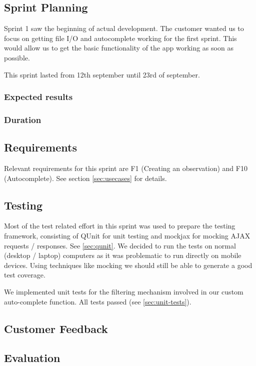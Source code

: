 \subsection{Sprint Planning}

	Sprint 1 saw the beginning of actual development. The customer wanted us to focus on getting file I/O and autocomplete working for the first sprint. This would allow us to get the basic functionality of the app working as soon as possible.

	This sprint lasted from 12th september until 23rd of september.

	\subsubsection{Expected results}
	
	\subsubsection{Duration}
	
	
\subsection{Requirements}

	Relevant requirements for this sprint are F1 (Creating an observation) and F10 (Autocomplete). See section \ref{sec:usecases} for details.


\subsection{Testing}

	Most of the test related effort in this sprint was used to prepare the
	testing framework, consisting of QUnit for unit testing and mockjax for
	mocking AJAX requests / responses. See \ref{sec:qunit}. We decided to run
	the tests on normal (desktop / laptop) computers as it was problematic to
	run directly on mobile devices. Using techniques like mocking we should
	still be able to generate a good test coverage.

	We implemented unit tests for the filtering mechanism involved in our custom
	auto-complete function. All tests passed (see \ref{sec:unit-tests}).

\subsection{Customer Feedback}

\subsection{Evaluation}
